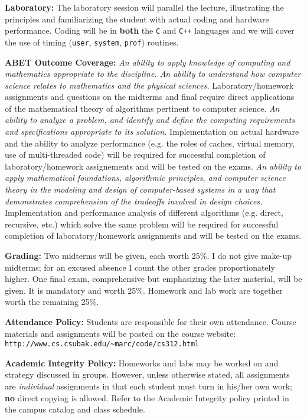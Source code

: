 \noindent
{\bf Laboratory:}
	\itemitem{} The laboratory session will parallel the 
	lecture, illustrating the principles and familiarizing the
	student with actual coding and hardware performance. Coding
	will be in {\bf both} the {\tt C} and {\tt C++} languages and 
	we will cover the use of timing 
	({\tt user}, {\tt system}, {\tt prof}) routines.

\noindent
{\bf ABET Outcome Coverage:}
   {\it An ability to apply knowledge of computing and mathematics
        appropriate to the discipline. An ability to understand how 
        computer science relates to mathematics and the physical sciences.}
	  Laboratory/homework assignments and questions on the 
	midterms and final require direct applications of the 
	mathematical theory of algorithms pertinent to computer science.
   {\it An ability to analyze a problem, and identify and define
        the computing requirements and specifications appropriate to 
	its solution.} 
	  Implementation on actual hardware and the ability to analyze
	performance (e.g. the roles of caches, virtual memory, use of
	multi-threaded code) will be required for successful completion
	of laboratory/homework assignements and will be tested on 
	the exams.
   {\it An ability to apply mathematical foundations, algorithmic
        principles, and computer science theory in the modeling and 
        design of computer-based systems in a way that demonstrates
        comprehension of the tradeoffs involved in design choices.}
	  Implementation and performance analysis of different algorithms 
	(e.g. direct, recursive, etc.) which solve the same problem will 
	be required for successful completion of laboratory/homework
	assignments and will be tested on the exams.
  
\noindent 
{\bf Grading:} 
	\itemitem{} Two midterms will be given, each worth 25\%.
	I do not give make-up midterms; for an excused absence I count the
	other grades proportionately higher.  One final exam, comprehensive
	but emphasizing the later material, will be given. It is mandatory
	and worth 25\%. Homework and lab work are together worth the
	remaining 25\%. 

\noindent
{\bf Attendance Policy:}
	\itemitem{} Students are responsible for their own attendance. 
	Course materials and assignments will be posted on the course
	website: \hfil\break
	{\tt http://www.cs.csubak.edu/\~{}marc/code/cs312.html}

\noindent
{\bf Academic Integrity Policy:}
	\itemitem{} Homeworks and labs may be worked on and strategy
	discussed in groups. However, unless otherwise stated, all 
	assignments are {\it individual} assignments in that each 
	student must turn in his/her own work; {\bf no} direct copying 
	is allowed.  Refer to the Academic Integrity policy printed in 
	the campus catalog and class schedule.

